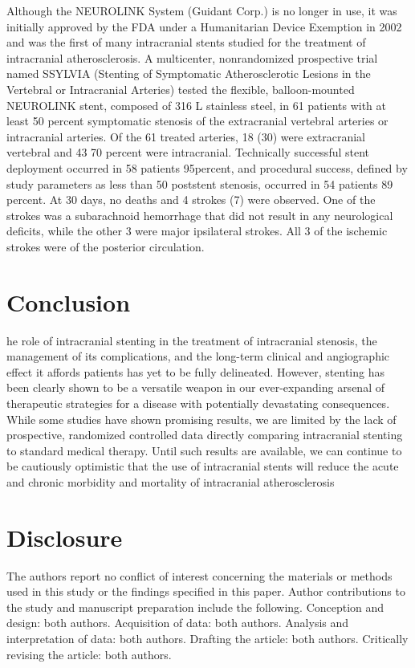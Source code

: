 \documentclass{article}
\begin{document}
Although the NEUROLINK System (Guidant Corp.) is no longer in use, it was initially approved by the FDA under a Humanitarian Device Exemption in 2002 and was the first of many intracranial stents studied for the treatment of intracranial atherosclerosis. A multicenter, nonrandomized prospective trial named SSYLVIA (Stenting of Symptomatic Atherosclerotic Lesions in the Vertebral or Intracranial Arteries) tested the flexible, balloon-mounted NEUROLINK stent, composed of 316 L stainless steel, in 61 patients with at least 50 percent symptomatic stenosis of the extracranial vertebral arteries or intracranial arteries. Of the 61 treated arteries, 18 (30) were extracranial vertebral and 43 70 percent were intracranial. Technically successful stent deployment occurred in 58 patients 95percent, and procedural success, defined by study parameters as less than 50 poststent stenosis, occurred in 54 patients 89 percent. At 30 days, no deaths and 4 strokes (7) were observed. One of the strokes was a subarachnoid hemorrhage that did not result in any neurological deficits, while the other 3 were major ipsilateral strokes. All 3 of the ischemic strokes were of the posterior circulation.


\section{Conclusion}

he role of intracranial stenting in the treatment of 
intracranial stenosis, the management of its complications, and the long-term clinical and angiographic effect 
it affords patients has yet to be fully delineated. However, 
stenting has been clearly shown to be a versatile weapon 
in our ever-expanding arsenal of therapeutic strategies 
for a disease with potentially devastating consequences. 
While some studies have shown promising results, we are 
limited by the lack of prospective, randomized controlled 
data directly comparing intracranial stenting to standard 
medical therapy. Until such results are available, we can 
continue to be cautiously optimistic that the use of intracranial stents will reduce the acute and chronic morbidity 
and mortality of intracranial atherosclerosis

\section{Disclosure}

The authors report no conflict of interest concerning the materials or methods used in this study or the findings specified in this 
paper.
Author contributions to the study and manuscript preparation 
include the following. Conception and design: both authors. Acquisition of data: both authors. Analysis and interpretation of data: both 
authors. Drafting the article: both authors. Critically revising the 
article: both authors.
\end{document}
